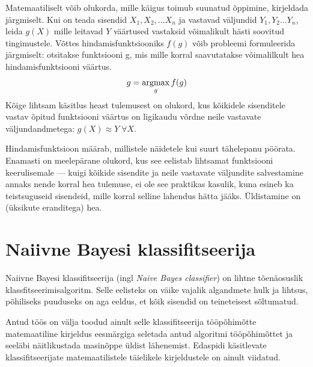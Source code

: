 \documentclass[]{trkuur}
\let\eng\emph
\newcommand{\argmax}{\operatornamewithlimits{argmax}}
\begin{document}
Matemaatiliselt võib olukorda, mille käigus toimub suunatud õppimine, kirjeldada järgmiselt.
Kui on teada sisendid \( X_1, X_2, \dots X_n \) ja vastavad väljundid \( Y_1,
Y_2 \dots Y_n \), leida \( g(X) \) mille leitavad \( Y \) väärtused vastaksid
võimalikult hästi soovitud tingimustele.
Võttes hindamisfunktsiooniks \( f(g) \) võib probleemi
formuleerida järgmiselt: otsitakse funktsiooni g, mis mille korral saavutatakse
võimalilkult hea hindamisfunktsiooni väärtus.
\[ g = \argmax_g f(g) \]
Kõige lihtsam käsitlus heast tulemusest on olukord, kus kõikidele sisenditele
vastav õpitud funktsiooni väärtus on ligikaudu võrdne neile vastavate väljundandmetega: \( g(X)
\approx Y \; \forall X \).

Hindamisfunktsioon määrab, millistele näidetele kui suurt tähelepanu pöörata.
Enamasti on meelepärane olukord, kus see eelistab lihtsamat funktsiooni
keerulisemale --- kuigi kõikide sisendite ja neile vastavate väljundite salvestamine annaks nende korral hea
tulemuse, ei ole see praktikas kasulik, kuna esineb ka teistsuguseid
sisendeid, mille korral selline lahendus hätta jääks. Üldistamine on (üksikute eranditega) hea.
\autocite{skienaOverfitting}

\section{Naiivne Bayesi klassifitseerija}
Naiivne Bayesi klassifitseerija (ingl \eng{Naive Bayes classifier})
on lihtne tõenäosuslik klassfitseerimisalgoritm.
Selle eelisteks on väike vajalik algandmete hulk ja lihtsus, põhiliseks
puuduseks on aga eeldus, et kõik sisendid on teineteisest sõltumatud.
\autocite{wiki-naive-bayes}

Antud töös on välja toodud ainult selle klassifitseerija tööpõhimõtte
matemaatiline kirjeldus eesmärgiga seletada antud algoritmi tööpõhimõttet ja
seeläbi näitlikustada masinõppe üldist lähenemist. Edaspidi käsitlevate
klassifitseerijate matemaatilistele täielikele kirjeldustele on ainult viidatud.
\end{document}
